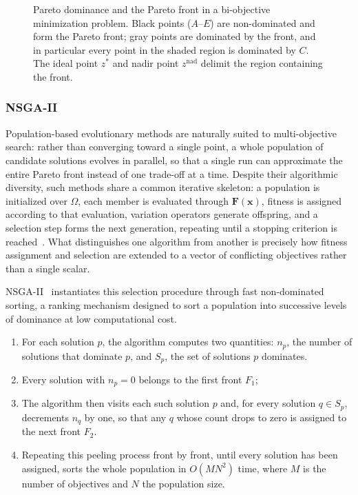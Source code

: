 \begin{figure}[htbp]
    \caption{Pareto dominance and the Pareto front in a bi-objective minimization problem. Black points ($A$--$E$) are non-dominated and form the Pareto front; gray points are dominated by the front, and in particular every point in the shaded region is dominated by $C$. The ideal point $z^\ast$ and nadir point $z^{\mathrm{nad}}$ delimit the region containing the front.}
    \label{fig:sota-pareto-front}
\end{figure}

\subsubsection{NSGA-II}
\label{sec:sota-emo}

Population-based evolutionary methods are naturally suited to multi-objective search: rather than converging toward a single point, a whole population of candidate solutions evolves in parallel, so that a single run can approximate the entire Pareto front instead of one trade-off at a time. Despite their algorithmic diversity, such methods share a common iterative skeleton: a population is initialized over $\Omega$, each member is evaluated through $\mathbf{F}(\mathbf{x})$, fitness is assigned according to that evaluation, variation operators generate offspring, and a selection step forms the next generation, repeating until a stopping criterion is reached~\cite{giagkiozis-2015, zhou-2011}. What distinguishes one algorithm from another is precisely how fitness assignment and selection are extended to a vector of conflicting objectives rather than a single scalar.

NSGA-II~\cite{deb-2002} instantiates this selection procedure through fast non-dominated sorting, a ranking mechanism designed to sort a population into successive levels of dominance at low computational cost. 
\begin{enumerate}
    \item For each solution $p$, the algorithm computes two quantities: $n_p$, the number of solutions that dominate $p$, and $S_p$, the set of solutions $p$ dominates.
    \item Every solution with $n_p = 0$ belongs to the first front $F_1$;
    \item The algorithm then visits each such solution $p$ and, for every solution $q \in S_p$, decrements $n_q$ by one, so that any $q$ whose count drops to zero is assigned to the next front $F_2$.
    \item  Repeating this peeling process front by front, until every solution has been assigned, sorts the whole population in $O(MN^2)$ time, where $M$ is the number of objectives and $N$ the population size.
\end{enumerate}

